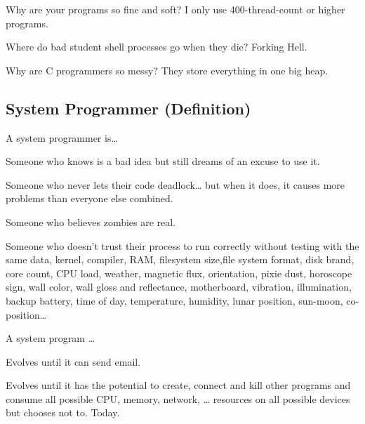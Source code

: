 Why are your programs so fine and soft? I only use 400-thread-count or higher programs.

Where do bad student shell processes go when they die? Forking Hell.

Why are C programmers so messy? They store everything in one big heap.

\subsection{System Programmer (Definition)}

A system programmer is\ldots{}

Someone who knows  is a bad idea but still dreams of an excuse to use it.

Someone who never lets their code deadlock\ldots{} but when it does, it causes more problems than everyone else combined.

Someone who believes zombies are real.

Someone who doesn't trust their process to run correctly without testing with the same data, kernel, compiler, RAM, filesystem size,file system format, disk brand, core count, CPU load, weather, magnetic flux, orientation, pixie dust, horoscope sign, wall color, wall gloss and reflectance, motherboard, vibration, illumination, backup battery, time of day, temperature, humidity, lunar position, sun-moon, co-position\ldots{}

A system program \ldots{}

Evolves until it can send email.

Evolves until it has the potential to create, connect and kill other programs and consume all possible CPU, memory, network, \ldots{} resources on all possible devices but chooses not to. Today.
